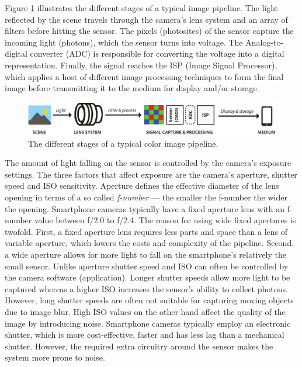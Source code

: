 \documentclass[thesis.tex]{subfiles}
\begin{document}
Figure \ref{figure:pipeline} illustrates the different stages of a typical image pipeline. The light reflected by the scene travels through the camera's lens system and an array of filters before hitting the sensor. The pixels (photosites) of the sensor capture the incoming light (photons), which the sensor turns into voltage. The Analog-to-digital converter (ADC) is responsible for converting the voltage into a digital representation. Finally, the signal reaches the ISP (Image Signal Processor), which applies a host of different image processing techniques to form the final image before transmitting it to the medium for display and/or storage.

\begin{figure}[ht]
\centering \includegraphics[width=\textwidth]{images/pipeline}
\caption{The different stages of a typical color image pipeline.\label{figure:pipeline}}
\end{figure}

The amount of light falling on the sensor is controlled by the camera's exposure settings. The three factors that affect exposure are the camera's aperture, shutter speed and ISO sensitivity. Aperture defines the effective diameter of the lens opening in terms of a so called \textit{f-number} --- the smaller the f-number the wider the opening. Smartphone cameras typically have a fixed aperture lens with an f-number value between f/2.0 to f/2.4. The reason for using wide fixed apertures is twofold. First, a fixed aperture lens requires less parts and space than a lens of variable aperture, which lowers the costs and complexity of the pipeline. Second, a wide aperture allows for more light to fall on the smartphone's relatively the small sensor. Unlike aperture shutter speed and ISO can often be controlled by the camera software (application). Longer shutter speeds allow more light to be captured whereas a higher ISO increases the sensor's ability to collect photons. However, long shutter speeds are often not suitable for capturing moving objects due to image blur. High ISO values on the other hand affect the quality of the image by introducing noise. Smartphone cameras typically employ an electronic shutter, which is more cost-effective, faster and has less lag than a mechanical shutter. However, the required extra circuitry around the sensor makes the system more prone to noise.
\end{document}
